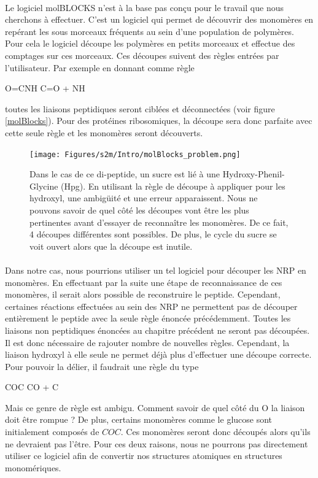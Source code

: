 \documentclass[12pt,french,twoside]{report}
\begin{document}
\paragraph{}Le logiciel molBLOCKS n'est à la base pas conçu pour le travail que nous cherchons à effectuer.
C'est un logiciel qui permet de découvrir des monomères en repérant les sous morceaux fréquents au sein d'une population de polymères.
Pour cela le logiciel découpe les polymères en petits morceaux et effectue des comptages sur ces morceaux.
Ces découpes suivent des règles entrées par l'utilisateur.
Par exemple en donnant comme règle
\begin{chemmath}
  O=CNH \longrightarrow C=O + NH
\end{chemmath}
toutes les liaisons peptidiques seront ciblées et déconnectées (voir figure \ref{molBlocks}).
Pour des protéines ribosomiques, la découpe sera donc parfaite avec cette seule règle et les monomères seront découverts.

\begin{figure}[!ht]
  \begin{center}
    \texttt{[image: Figures/s2m/Intro/molBlocks\_problem.png]}
    \caption{\label{molBlocks_problem}Dans le cas de ce di-peptide, un sucre est lié à une Hydroxy-Phenil-Glycine (Hpg).
    En utilisant la règle de découpe à appliquer pour les hydroxyl, une ambigüité et une erreur apparaissent.
    Nous ne pouvons savoir de quel côté les découpes vont être les plus pertinentes avant d'essayer de reconnaître les monomères.
    De ce fait, 4 découpes différentes sont possibles.
    De plus, le cycle du sucre se voit ouvert alors que la découpe est inutile.}
  \end{center}
\end{figure}

\paragraph{}Dans notre cas, nous pourrions utiliser un tel logiciel pour découper les NRP en monomères.
En effectuant par la suite une étape de reconnaissance de ces monomères, il serait alors possible de reconstruire le peptide.
Cependant, certaines réactions effectuées au sein des NRP ne permettent pas de découper entièrement le peptide avec la seule règle énoncée précédemment.
Toutes les liaisons non peptidiques énoncées au chapitre précédent ne seront pas découpées.
Il est donc nécessaire de rajouter nombre de nouvelles règles.
Cependant, la liaison hydroxyl à elle seule ne permet déjà plus d'effectuer une découpe correcte.
Pour pouvoir la délier, il faudrait une règle du type
\begin{chemmath}
  COC \longrightarrow CO + C
\end{chemmath}
Mais ce genre de règle est ambigu.
Comment savoir de quel côté du O la liaison doit être rompue ?
De plus, certains monomères comme le glucose sont initialement composés de $COC$.
Ces monomères seront donc découpés alors qu'ils ne devraient pas l'être.
Pour ces deux raisons, nous ne pourrons pas directement utiliser ce logiciel afin de convertir nos structures atomiques en structures monomériques.
\end{document}
